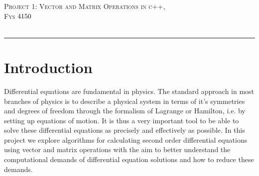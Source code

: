 \documentclass[a4paper,11pt]{article}
\newcommand*{\boisik}{\fontfamily{bsk}\selectfont} %
\begin{document}
	{
		\SetBgVshift{-1.2cm}
		\SetBgHshift{-10.5cm}
		$$\:$$
		\begin{center}
			\vspace{0.2cm}%
			\fontsize{15}{15}\selectfont \textsc{ Project 1: Vector and Matrix Operations in c++},\\
			\fontsize{13}{13}\selectfont \textsc{Fys $\textnormal{{4150}}$ }\\
			\vspace{0.4cm}
			\fontsize{12}{12}\\
			\vspace{0.5cm}
		\end{center}
		
		\rule{\textwidth}{0.3pt}\par
		
		
		
		\section*{Introduction}
		
		Differential equations are fundamental in physics. The standard approach in most branches of physics is to describe a physical system in terms of it's symmetries and degrees of freedom through the formalism of Lagrange or Hamilton, i.e. by setting up equations of motion. It is thus a very important tool to be able to solve these differential equations as precisely and effectively as possible. In this project we explore algorithms for calculating second order differential equations using vector and matrix operations with the aim to better understand the computational demands of differential equation solutions and how to reduce these demands.
		
		
		
}
\end{document}
